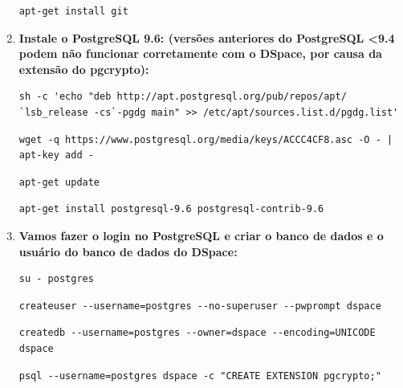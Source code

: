 \documentclass[12pt,hidelinks]{article}
\begin{document}
\begin{enumerate}
            \begin{verbatim}
apt-get install git
            \end{verbatim}
            
        \item \textbf{Instale o PostgreSQL 9.6: (versões anteriores do PostgreSQL <9.4 podem não funcionar corretamente com o DSpace, por causa da extensão do pgcrypto):}\\
            
        \begin{verbatim}
sh -c 'echo "deb http://apt.postgresql.org/pub/repos/apt/
`lsb_release -cs`-pgdg main" >> /etc/apt/sources.list.d/pgdg.list'
        \end{verbatim}

       \begin{verbatim}
wget -q https://www.postgresql.org/media/keys/ACCC4CF8.asc -O - | apt-key add -
       \end{verbatim}
      
       \begin{verbatim}
apt-get update
       \end{verbatim}
            
        \begin{verbatim}
apt-get install postgresql-9.6 postgresql-contrib-9.6
       \end{verbatim}


        \item \textbf{Vamos fazer o login no PostgreSQL e criar o banco de dados e o usuário do banco de dados do DSpace:}\\
        
            \begin{verbatim}
su - postgres
            \end{verbatim}
            
            \begin{verbatim}
createuser --username=postgres --no-superuser --pwprompt dspace
            \end{verbatim}
            
            \begin{verbatim}
createdb --username=postgres --owner=dspace --encoding=UNICODE dspace
            \end{verbatim}
            
            \begin{verbatim}
psql --username=postgres dspace -c "CREATE EXTENSION pgcrypto;"
            \end{verbatim}
            

\end{enumerate}
\end{document}
